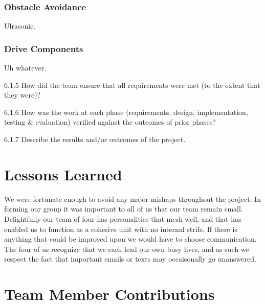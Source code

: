 \documentclass[11pt,letterpaper]{article}
\begin{document}
\subsubsection{Obstacle Avoidance}
Ulrasonic.
\subsubsection{Drive Components}
Uh whatever.



6.1.5 How did the team ensure that all requirements were met (to the extent that they were)?

6.1.6 How was the work at each phase (requirements, design, implementation, testing \& evaluation) verified against the outcomes of prior phases?

6.1.7 Describe the results and/or outcomes of the project.

\section{Lessons Learned}


We were fortunate enough to avoid any major mishaps throughout the project. In
forming our group it was important to all of us that our team remain small.
Delightfully our team of four has personalities that mesh well, and that has
enabled us to function as a cohesive unit with no internal strife.
If there is anything that could be improved upon we would have to choose
communication.  The four of us recognize that we each lead our own busy lives,
and as such we respect the fact that important emails or texts may occaisonally
go unanswered.


\section{Team Member Contributions}
\end{document}
